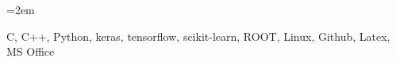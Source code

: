 \documentclass[xcolor=dvipsnames]{scrartcl}
\newcommand{\MarginText}[1]{\marginpar{\raggedleft\itshape\small#1}} %
\newcommand{\Description}[1]{\hangindent=2em\hangafter=0\noindent\raggedright\footnotesize{#1}\par\normalsize\vspace{1em}} %
\begin{document}
\begin{cv}{}
\noindent{}\vspace{1em}

\Description{C, C++, Python, keras, tensorflow, scikit-learn, ROOT, Linux, Github, Latex, MS Office}



\vspace{1em} %


\noindent{}\vspace{1em}










\vspace{1em}

\newlength{\langbox} %
\settowidth{\langbox}{English} %


\end{cv}
\end{document}
